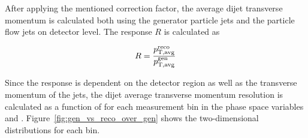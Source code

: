 After applying the mentioned correction factor, the average dijet
transverse momentum is calculated both using the generator particle jets and
the particle flow jets on detector level. The response $R$ is calculated as

\begin{equation}
    R = \frac{p_{\mathrm{T,avg}}^{\text{reco}}}{p_{\mathrm{T,avg}}^{\text{gen}}}
\end{equation}

Since the response is dependent on the detector region as well as the transverse
momentum of the jets, the dijet average transverse momentum resolution is
calculated as a function of \ptavggen for each measurement bin in the phase
space variables \ystar and \yboost. Figure~\ref{fig:gen_vs_reco_over_gen} shows the
two-dimensional distributions for each bin.

